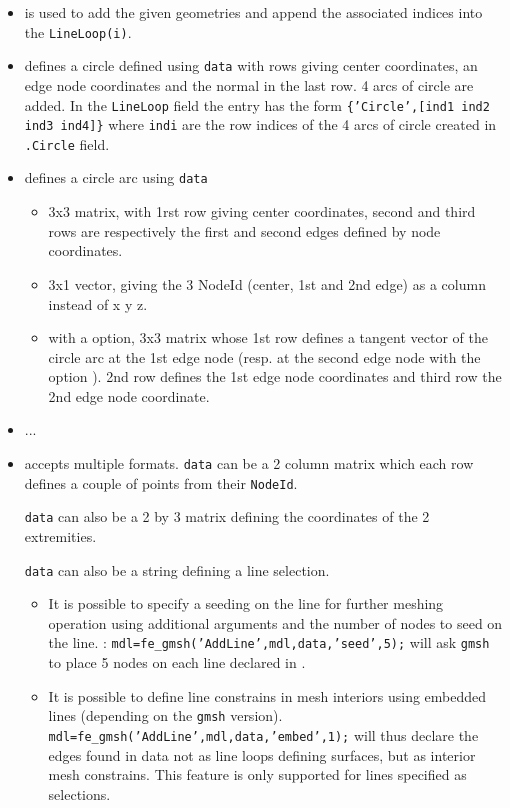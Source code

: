 \begin{itemize}

\item {} is used to add the given geometries and append the associated indices into the {\tt LineLoop(i)}.
\item {} defines a circle defined using {\tt data} with rows giving  center coordinates, an edge node coordinates and the normal in the last row. 4 arcs of circle are added. In the {\tt LineLoop} field the entry has the form {\tt \{'Circle',[ind1 ind2 ind3 ind4]\}} where {\tt indi} are the row indices of the 4 arcs of circle created in {\tt .Circle} field. \\

\item {} defines a circle arc using {\tt data} 
\begin{itemize}
\item 3x3 matrix, with 1rst row giving center coordinates, second and third rows are respectively the first and second edges defined by node coordinates.
\item 3x1 vector, giving the 3 NodeId (center, 1st and 2nd edge) as a column instead of x y z. 
\item with a  option, 3x3 matrix whose 1st row defines a tangent vector of the circle arc at the 1st edge node (resp. at the second edge node with the option ). 2nd row defines the 1st edge node coordinates and third row the 2nd edge node coordinate.
\end{itemize}

\item {} ...\\

\item {} accepts multiple formats. {\tt data} can be a 2 column matrix which each row defines a couple of points from their {\tt NodeId}. 

{\tt data} can also be a 2 by 3 matrix defining the coordinates of the 2 extremities. 

{\tt data} can also be a string defining a line selection. 

\begin{itemize}
\item It is possible to specify a seeding on the line for further meshing operation using additional arguments  and the number of nodes to seed on the line. :
{\tt mdl=fe\_gmsh('AddLine',mdl,data,'seed',5);} will ask {\tt gmsh} to place 5 nodes on each line declared in .
\item It is possible to define line constrains in mesh interiors using embedded lines (depending on the {\tt gmsh} version). 
{\tt mdl=fe\_gmsh('AddLine',mdl,data,'embed',1);} will thus declare the edges found in data not as line loops defining surfaces, but as interior mesh constrains. This feature is only supported for lines specified as selections.
\end{itemize}


\end{itemize}
